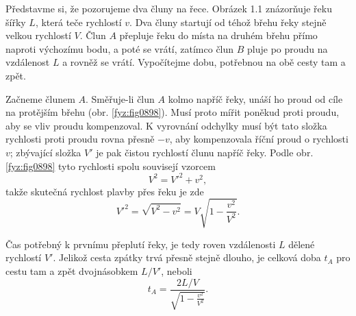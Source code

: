 \begin{mdframed}[style=mdexam]
  \begin{example}\label{fyz:fey_exam015}
    Představme si, že pozorujeme dva čluny na řece. Obrázek 1.1 znázorňuje řeku šířky \(L\), která
    teče rychlostí \(v\). Dva čluny startují od téhož břehu řeky stejně velkou rychlostí \(V\). Člun
    \(A\) přepluje řeku do místa na druhém břehu přímo naproti výchozímu bodu, a poté se vrátí,
    zatímco člun \(B\) pluje po proudu na vzdálenost \(L\) a rovněž se vrátí. Vypočítejme dobu,
    potřebnou na obě cesty tam a zpět. \newline

    {\centering\captionsetup{type=figure}\par}

    \vspace{1em}
    Začneme člunem \(A\). Směřuje-li člun \(A\) kolmo napříč řeky, unáší ho proud od cíle na
    protějším břehu (obr. \ref{fyz:fig0898}). Musí proto mířit poněkud proti proudu, aby se vliv
    proudu kompenzoval. K vyrovnání odchylky musí být tato složka rychlosti proti proudu rovna
    přesně \(-v\), aby kompenzovala říční proud o rychlosti \(v\); zbývající složka \(V'\) je pak
    čistou rychlostí člunu napříč řeky. Podle obr. \ref{fyz:fig0898} tyto rychlosti spolu souvisejí
    vzorcem
    \begin{equation*}
      V^2 = V'^2 + v^2,
    \end{equation*}
    takže skutečná rychlost plavby přes řeku je zde
    \begin{equation*}
      V'^2 = \sqrt{V^2 - v^2} = V\sqrt{1 - \frac{v^2}{V^2}}.
    \end{equation*}

    {\centering
    \captionsetup{type=figure}
    \par}
    \vspace{1em}
    Čas potřebný k prvnímu přeplutí řeky, je tedy roven vzdálenosti \(L\) dělené rychlostí \(V'\).
    Jelikož cesta zpátky trvá přesně stejně dlouho, je celková doba \(t_A\) pro cestu tam a zpět
    dvojnásobkem \(L/V'\), neboli 
    \begin{equation*}
      t_A = \frac{2L/V}{\sqrt{1 - \frac{v^2}{V^2}}}.
    \end{equation*}


\end{example}
\end{mdframed}
